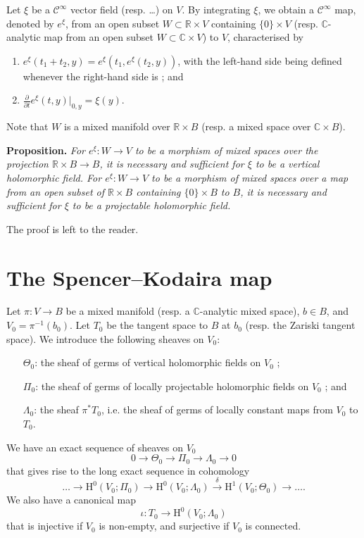 \documentclass{article}
\newenvironment{itenv}[1]
  {\par\medskip\noindent\textbf{#1.}\itshape}
  {\medskip}
\newcommand{\RR}{\mathbb{R}}
\newcommand{\CC}{\mathbb{C}}
\newcommand{\HH}{\mathrm{H}}
\newcommand{\oldpage}[1]{\marginpar{\footnotesize$\Big\vert$ \textit{p.~#1}}}
\begin{document}
\oldpage{2-06}
Let $\xi$ be a $\mathscr{C}^\infty$ vector field (resp. \ldots) on $V$.
By integrating $\xi$, we obtain a $\mathscr{C}^\infty$ map, denoted by $e^\xi$, from an open subset $W\subset\RR\times V$ containing $\{0\}\times V$ (resp. $\CC$-analytic map from an open subset $W\subset\CC\times V$) to $V$, characterised by
\begin{enumerate}[(1)]
  \item $e^\xi(t_1+t_2,y) = e^\xi(t_1,e^\xi(t_2,y))$, with the left-hand side being defined whenever the right-hand side is ; and
  \item $\frac{\partial}{\partial t}e^\xi(t,y)|_{0,y} = \xi(y)$.
\end{enumerate}
Note that $W$ is a mixed manifold over $\RR\times B$ (resp. a mixed space over $\CC\times B$).

\begin{itenv}{Proposition}
  For $e^\xi\colon W\to V$ to be a morphism of mixed spaces over the projection $\RR\times B\to B$, it is necessary and sufficient for $\xi$ to be a vertical holomorphic field.
  For $e^\xi\colon W\to V$ to be a morphism of mixed spaces over a map from an open subset of $\RR\times B$ containing $\{0\}\times B$ to $B$, it is necessary and sufficient for $\xi$ to be a projectable holomorphic field.
\end{itenv}

The proof is left to the reader.


\section{The Spencer--Kodaira map}
\label{IV}

Let $\pi\colon V\to B$ be a mixed manifold (resp. a $\CC$-analytic mixed space), $b\in B$, and $V_0=\pi^{-1}(b_0)$.
Let $T_0$ be the tangent space to $B$ at $b_0$ (resp. the Zariski tangent space).
We introduce the following sheaves on $V_0$:
\begin{itemize}
  \item[$\Theta_0$:] the sheaf of germs of vertical holomorphic fields on $V_0$ ;
  \item[$\Pi_0$:] the sheaf of germs of locally projectable holomorphic fields on $V_0$ ; and
  \item[$\Lambda_0$:] the sheaf $\pi^*T_0$, i.e. the sheaf of germs of locally constant maps from $V_0$ to $T_0$.
\end{itemize}

We have an exact sequence of sheaves on $V_0$
\[
  0 \to \Theta_0 \to \Pi_0 \to \Lambda_0 \to 0
\]
that gives rise to the long exact sequence in cohomology
\[
  \ldots \to \HH^0(V_0;\Pi_0) \to \HH^0(V_0;\Lambda_0) \xrightarrow{\delta} \HH^1(V_0;\Theta_0) \to \ldots.
\]
We also have a canonical map
\oldpage{2-07}
\[
  \iota\colon T_0 \to \HH^0(V_0;\Lambda_0)
\]
that is injective if $V_0$ is non-empty, and surjective if $V_0$ is connected.
\end{document}
